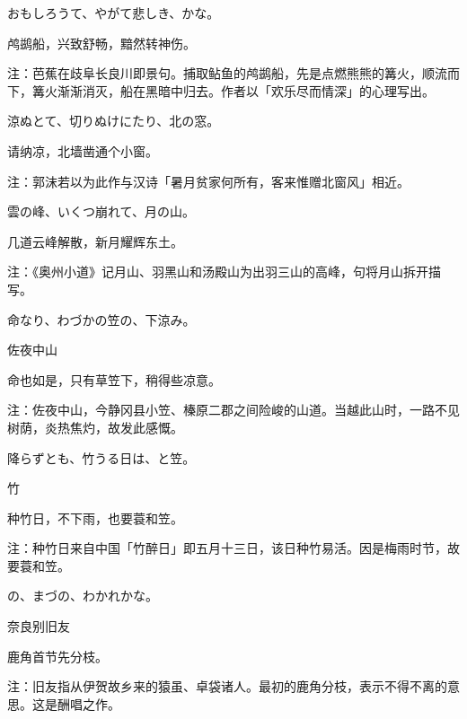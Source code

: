 \begin{haiku}
    {\FH おもしろうて、やがて悲しき、かな。}

    {\FK 鸬鹚船，兴致舒畅，黯然转神伤。}

    {\FT 注：芭蕉在歧阜长良川即景句。捕取鲇鱼的鸬鹚船，先是点燃熊熊的篝火，顺流而下，篝火渐渐消灭，船在黑暗中归去。作者以「欢乐尽而情深」的心理写出。}
\end{haiku}

\begin{haiku}
    {\FH 涼ぬとて、切りぬけにたり、北の窓。}

    {\FK 请纳凉，北墙凿通个小窗。}

    {\FT 注：郭沫若以为此作与汉诗「暑月贫家何所有，客来惟赠北窗风」相近。}
\end{haiku}

\begin{haiku}
    {\FH 雲の峰、いくつ崩れて、月の山。}

    {\FK 几道云峰解散，新月耀辉东土。}

    {\FT 注：《奥州小道》记月山、羽黑山和汤殿山为出羽三山的高峰，句将月山拆开描写。}
\end{haiku}

\begin{haiku}
    {\FH 命なり、わづかの笠の、下涼み。}

    {\FK 佐夜中山}

    {\FK 命也如是，只有草笠下，稍得些凉意。}

    {\FT 注：佐夜中山，今静冈县小笠、榛原二郡之间险峻的山道。当越此山时，一路不见树荫，炎热焦灼，故发此感慨。}
\end{haiku}

\begin{haiku}
    {\FH 降らずとも、竹うる日は、と笠。}

    {\FK 竹}

    {\FK 种竹日，不下雨，也要蓑和笠。}

    {\FT 注：种竹日来自中国「竹醉日」即五月十三日，该日种竹易活。因是梅雨时节，故要蓑和笠。}
\end{haiku}

\begin{haiku}
    {\FH {}の、まづの、わかれかな。}

    {\FK 奈良别旧友}

    {\FK 鹿角首节先分枝。}

    {\FT 注：旧友指从伊贺故乡来的猿虽、卓袋诸人。最初的鹿角分枝，表示不得不离的意思。这是酬唱之作。}
\end{haiku}

